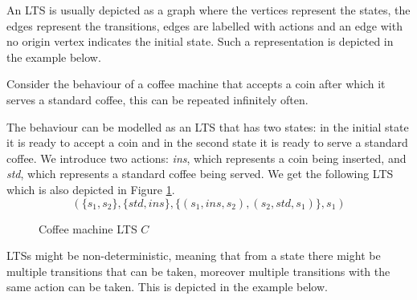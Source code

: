 An LTS is usually depicted as a graph where the vertices represent the states, the edges represent the transitions, edges are labelled with actions and an edge with no origin vertex indicates the initial state. Such a representation is depicted in the example below.
\begin{example}
	Consider the behaviour of a coffee machine that accepts a coin after which it serves a standard coffee, this can be repeated infinitely often. 
	
	The behaviour can be modelled as an LTS that has two states: in the initial state it is ready to accept a coin and in the second state it is ready to serve a standard coffee. We introduce two actions: \textit{ins}, which represents a coin being inserted, and \textit{std}, which represents a standard coffee being served. We get the following LTS which is also depicted in Figure \ref{fig:coffeemachinebasiceurolts}.
	\[ (\{s_1,s_2\},\{std,ins\},\{(s_1,ins,s_2),(s_2,std,s_1)\},s_1)\]
	\begin{figure}[h]
		\centering
		\caption[Coffee machine LTS]{Coffee machine LTS $C$}
		\label{fig:coffeemachinebasiceurolts}
	\end{figure}
\end{example}

LTSs might be non-deterministic, meaning that from a state there might be multiple transitions that can be taken, moreover multiple transitions with the same action can be taken. This is depicted in the example below.

